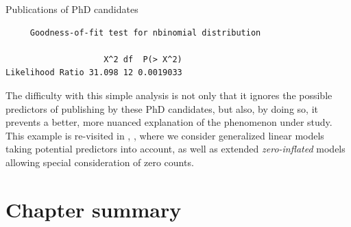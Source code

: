 \documentclass[10pt,krantz2]{krantz}\usepackage[]{graphicx}\usepackage[]{color}
\makeatletter
\newenvironment{kframe}{%
 \def\at@end@of@kframe{}%
 \ifinner\ifhmode%
  \def\at@end@of@kframe{\end{minipage}}%
  \begin{minipage}{\columnwidth}%
 \fi\fi%
 \def\FrameCommand##1{\hskip\@totalleftmargin \hskip-\fboxsep
 \colorbox{shadecolor}{##1}\hskip-\fboxsep
     \hskip-\linewidth \hskip-\@totalleftmargin \hskip\columnwidth}%
 \MakeFramed {\advance\hsize-\width
   \@totalleftmargin\z@ \linewidth\hsize
   \@setminipage}}%
 {\par\unskip\endMakeFramed%
 \at@end@of@kframe}
\newenvironment{knitrout}{}{} %
\renewenvironment{knitrout}{\small\renewcommand{\baselinestretch}{.85}}{} %
\makeatother
\begin{document}
\begin{Example}[phdpubs0]{Publications of PhD candidates}
\begin{knitrout}
\begin{kframe}
\begin{verbatim}
	 Goodness-of-fit test for nbinomial distribution

                    X^2 df  P(> X^2)
Likelihood Ratio 31.098 12 0.0019033
\end{verbatim}
\end{kframe}
\end{knitrout}

The difficulty with this simple analysis is not only that it ignores the possible
predictors of publishing by these PhD candidates, but also, by doing so, it
prevents a better, more nuanced explanation of the phenomenon under study.
This example is re-visited in ,
,
where we consider generalized linear models taking potential predictors into
account, as well as extended \emph{zero-inflated}
models allowing special consideration of zero counts.
\end{Example}

\section{Chapter summary}\label{sec:ch03-summary}
\end{document}
